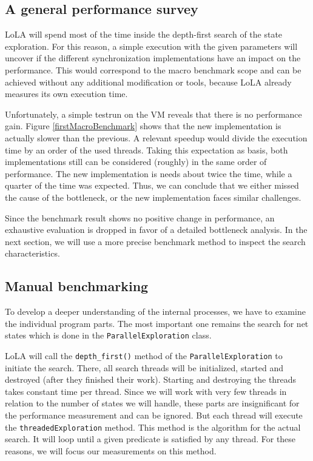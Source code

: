 \subsection{A general performance survey}
LoLA will spend most of the time inside the depth-first search of the state exploration. For this reason, a simple execution with the given parameters will uncover if the different synchronization implementations have an impact on the performance. This would correspond to the macro benchmark scope and can be achieved without any additional modification or tools, because LoLA already measures its own execution time.

Unfortunately, a simple testrun on the VM reveals that there is no performance gain. Figure \ref{firstMacroBenchmark} shows that the new implementation is actually slower than the previous. A relevant speedup would divide the execution time by an order of the used threads. Taking this expectation as basis, both implementations still can be considered (roughly) in the same order of performance. The new implementation is needs about twice the time, while a quarter of the time was expected. Thus, we can conclude that we either missed the cause of the bottleneck, or the new implementation faces similar challenges.



Since the benchmark result shows no positive change in performance, an exhaustive evaluation is dropped in favor of a detailed bottleneck analysis. In the next section, we will use a more precise benchmark method to inspect the search characteristics.

\subsection{Manual benchmarking}
To develop a deeper understanding of the internal processes, we have to examine the individual program parts. The most important one remains the search for net states which is done in the \texttt{ParallelExploration} class.

LoLA will call the \texttt{depth\_first()} method of the \texttt{ParallelExploration} to initiate the search. There, all search threads will be initialized, started and destroyed (after they finished their work). Starting and destroying the threads takes constant time per thread. Since we will work with very few threads in relation to the number of states we will handle, these parts are insignificant for the performance measurement and can be ignored. But each thread will execute the \texttt{threadedExploration} method. This method is the algorithm for the actual search. It will loop until a given predicate is satisfied by any thread. For these reasons, we will focus our measurements on this method.

